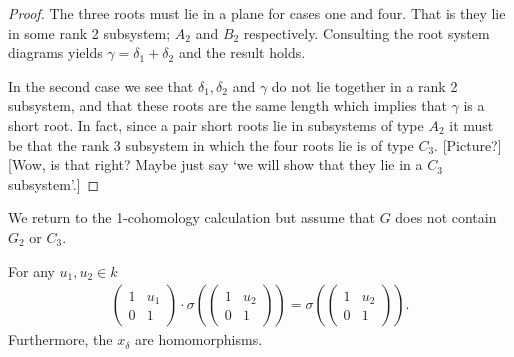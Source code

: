 \begin{proof}
The three roots must lie in a plane for cases one and four. That is they lie in some rank 2 subsystem; $A_2$ and $B_2$ respectively. Consulting the root system diagrams yields $\gamma = \delta_1 + \delta_2$ and the result holds.

In the second case we see that $\delta_1, \delta_2$ and $\gamma$ do not lie together in a rank 2 subsystem, and that these roots are the same length which implies that $\gamma$ is a short root. In fact, since a pair short roots lie in subsystems of type $A_2$ it must be that the rank 3 subsystem in which the four roots lie is of type $C_3$. [Picture?][Wow, is that right? Maybe just say `we will show that they lie in a $C_3$ subsystem'.]
\end{proof}

We return to the 1-cohomology calculation but assume that $G$ does not contain $G_2$ or $C_3$.

\begin{corollary}\label{uact} For any $u_1, u_2 \in k$
\begin{eqnarray*}
\left(\begin{matrix}1 & u_1 \\ 0 & 1 \end{matrix}\right)
\cdot
\sigma\left(\left(\begin{matrix} 1 & u_2 \\ 0 & 1\end{matrix}\right)\right)
=
\sigma\left(\left(\begin{matrix} 1 & u_2 \\ 0 & 1\end{matrix}\right)\right).
\end{eqnarray*}
Furthermore, the $x_\delta$ are homomorphisms.
\end{corollary}

